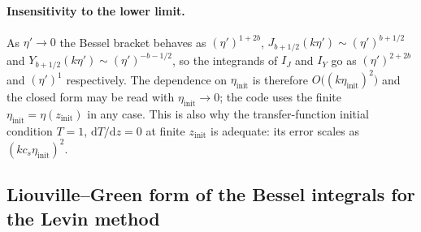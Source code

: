 \documentclass[11pt,a4paper]{article}
\newcommand{\dd}{\mathrm{d}}
\newcommand{\zinit}{z_{\mathrm{init}}}
\newcommand{\etainit}{\eta_{\mathrm{init}}}
\theoremstyle{remark}
\begin{document}
\paragraph{Insensitivity to the lower limit.} As $\eta'\to0$ the Bessel bracket behaves as $(\eta')^{1+2b}$, $J_{b+1/2}(k\eta')\sim(\eta')^{b+1/2}$ and $Y_{b+1/2}(k\eta')\sim(\eta')^{-b-1/2}$, so the integrands of $I_J$ and $I_Y$ go as $(\eta')^{2+2b}$ and $(\eta')^{1}$ respectively. The dependence on $\etainit$ is therefore $O\big((k\etainit)^2\big)$ and the closed form may be read with $\etainit\to0$; the code uses the finite $\etainit = \eta(\zinit)$ in any case. This is also why the transfer-function initial condition $T=1$, $\dd T/\dd z = 0$ at finite $\zinit$ is adequate: its error scales as $(kc_s\etainit)^2$.

\subsection{Liouville--Green form of the Bessel integrals for the Levin method}
\label{sec:levin}
\end{document}
